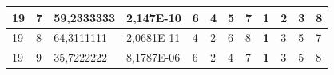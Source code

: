 \documentclass[conference]{IEEEtran}
\begin{document}
\begin{table}[]
\begin{tabular}{|llll|llllllll|}
\multicolumn{1}{|l|}{19}                                                    & \multicolumn{1}{l|}{7}                                                        & \multicolumn{1}{l|}{59,2333333}                                                   & 2,147E-10                      & \multicolumn{1}{l|}{6}                                                  & \multicolumn{1}{l|}{4}                                                  & \multicolumn{1}{l|}{5}                                                  & \multicolumn{1}{l|}{7}                                                  & \multicolumn{1}{l|}{\textbf{1}}                                         & \multicolumn{1}{l|}{2}                                                  & \multicolumn{1}{l|}{3}                                                  & 8                          \\ \hline
\multicolumn{1}{|l|}{19}                                                    & \multicolumn{1}{l|}{8}                                                        & \multicolumn{1}{l|}{64,3111111}                                                   & 2,0681E-11                     & \multicolumn{1}{l|}{4}                                                  & \multicolumn{1}{l|}{2}                                                  & \multicolumn{1}{l|}{6}                                                  & \multicolumn{1}{l|}{8}                                                  & \multicolumn{1}{l|}{\textbf{1}}                                         & \multicolumn{1}{l|}{3}                                                  & \multicolumn{1}{l|}{5}                                                  & 7                          \\ \hline
\multicolumn{1}{|l|}{19}                                                    & \multicolumn{1}{l|}{9}                                                        & \multicolumn{1}{l|}{35,7222222}                                                   & 8,1787E-06                     & \multicolumn{1}{l|}{6}                                                  & \multicolumn{1}{l|}{2}                                                  & \multicolumn{1}{l|}{4}                                                  & \multicolumn{1}{l|}{7}                                                  & \multicolumn{1}{l|}{\textbf{1}}                                         & \multicolumn{1}{l|}{3}                                                  & \multicolumn{1}{l|}{5}                                                  & 8                          \\ \hline

\end{tabular}
\end{table}
\end{document}
